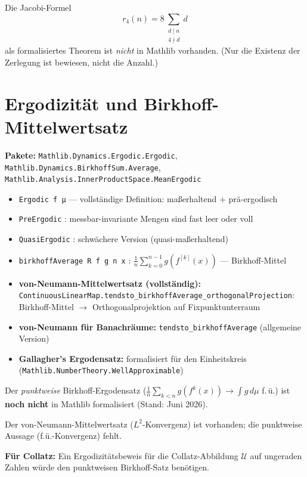 \documentclass[12pt,a4paper]{article}
\newcommand{\Mathlib}[1]{\texttt{Mathlib.\allowbreak #1}}
\begin{document}
\begin{tcolorbox}[lücke, title={Fehlt: Jacobi-Vierquadratensatz (Zählformel)}]
Die Jacobi-Formel
\[
  r_4(n) = 8\sum_{\substack{d\mid n \\ 4\nmid d}} d
\]
als formalisiertes Theorem ist \emph{nicht} in Mathlib vorhanden.
(Nur die Existenz der Zerlegung ist bewiesen, nicht die Anzahl.)
\end{tcolorbox}

\section{Ergodizität und Birkhoff-Mittelwertsatz}
\label{sec:ergodic}

\begin{tcolorbox}[vorhanden, title={Formalisiert: Ergodizitäts-Infrastruktur}]
\textbf{Pakete:} \Mathlib{Dynamics.Ergodic.Ergodic},
\Mathlib{Dynamics.BirkhoffSum.Average},
\Mathlib{Analysis.InnerProductSpace.MeanErgodic}

\begin{itemize}[nosep]
  \item \texttt{Ergodic f μ} --- vollständige Definition: maßerhaltend + pr\"a-ergodisch
  \item \texttt{PreErgodic} : messbar-invariante Mengen sind fast leer oder voll
  \item \texttt{QuasiErgodic} : schwächere Version (quasi-maßerhaltend)
  \item \texttt{birkhoffAverage R f g n x} :
    $\frac{1}{n}\sum_{k=0}^{n-1} g(f^{[k]}(x))$ --- Birkhoff-Mittel
  \item \textbf{von-Neumann-Mittelwertsatz (vollständig):}
    \texttt{ContinuousLinearMap.tendsto\_birkhoffAverage\_orthogonalProjection}:
    Birkhoff-Mittel $\to$ Orthogonalprojektion auf Fixpunktunterraum
  \item \textbf{von-Neumann für Banachräume:}
    \texttt{tendsto\_birkhoffAverage} (allgemeine Version)
  \item \textbf{Gallagher's Ergodensatz:} formalisiert für den Einheitskreis
    (\Mathlib{NumberTheory.WellApproximable})
\end{itemize}
\end{tcolorbox}

\begin{tcolorbox}[lücke, title={Fehlt: Birkhoff-Punktgrenzwertsatz (Punktweise Version)}]
Der \emph{punktweise} Birkhoff-Ergodensatz
($\frac{1}{n}\sum_{k<n} g(f^k(x)) \to \int g\,d\mu$ f.\,ü.)
ist \textbf{noch nicht} in Mathlib formalisiert (Stand: Juni 2026).

Der von-Neumann-Mittelwertsatz ($L^2$-Konvergenz) ist vorhanden;
die punktweise Aussage (f.ü.-Konvergenz) fehlt.

\textbf{Für Collatz:} Ein Ergodizitätsbeweis für die Collatz-Abbildung
$\mathcal{U}$ auf ungeraden Zahlen würde den punktweisen Birkhoff-Satz benötigen.
\end{tcolorbox}
\end{document}
